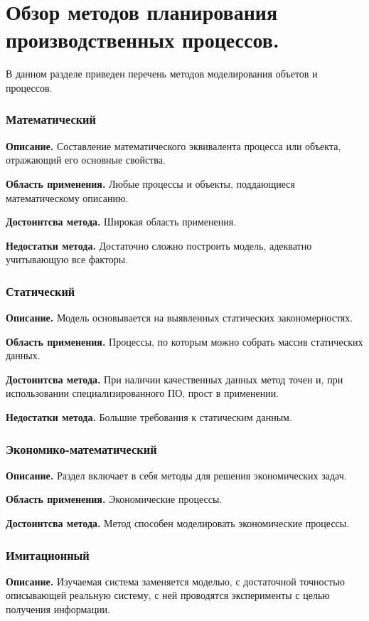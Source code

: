 \section{Обзор методов планирования производственных процессов.}

В данном разделе приведен перечень методов моделирования объетов и процессов.

\subsubsection{Математический}
\textbf{Описание.} Составление математического эквивалента процесса или объекта, отражающий его основные свойства.

\textbf{Область применения.} Любые процессы и объекты, поддающиеся математическому описанию.

\textbf{Достоинтсва метода.} Широкая область применения.

\textbf{Недостатки метода.} Достаточно сложно построить модель, адекватно учитывающую все факторы.

\subsubsection{Статический}
\textbf{Описание.} Модель основывается на выявленных статических закономерностях.

\textbf{Область применения.} Процессы, по которым можно собрать массив статических данных.

\textbf{Достоинтсва метода.} При наличии качественных данных метод точен и, при использовании специализированного ПО, прост в применении.

\textbf{Недостатки метода.} Большие требования к статическим данным.
\subsubsection{Экономико-математический}
\textbf{Описание.} Раздел включает в себя методы для решения экономических задач.

\textbf{Область применения.} Экономические процессы.

\textbf{Достоинтсва метода.} Метод способен моделировать экономические процессы.

\subsubsection{Имитационный}
\textbf{Описание.} Изучаемая система заменяется моделью, с достаточной точностью описывающей реальную систему, с ней проводятся эксперименты с целью получения информации.

